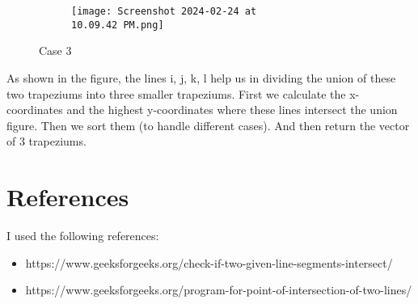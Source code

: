 \documentclass[a4paper,12pt]{article}
\begin{document}
\begin{itemize}
\begin{figure}[h]
        \begin{subfigure}{0.45\linewidth}
            \centering
            \texttt{[image: Screenshot 2024-02-24 at 10.09.42 PM.png]}
        \end{subfigure}
        \caption{Case 3}
    \end{figure} 
        As shown in the figure, the lines i, j, k, l help us in dividing the union of these two trapeziums into three smaller trapeziums.
        First we calculate the x-coordinates and the highest y-coordinates where these lines intersect the union figure. Then we sort them (to handle different cases). And then return the vector of 3 trapeziums.  
\end{itemize}

\section{References}
I used the following references:
\begin{itemize}
    \item https://www.geeksforgeeks.org/check-if-two-given-line-segments-intersect/
    \item https://www.geeksforgeeks.org/program-for-point-of-intersection-of-two-lines/
\end{itemize}
\end{document}
